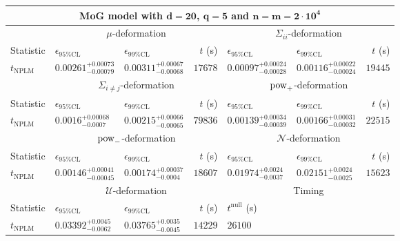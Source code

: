 \begin{tabular}{l|llr|llr}
	\toprule
	\multicolumn{7}{c}{{\bf MoG model with $\mathbf{d=20}$, $\mathbf{q=5}$ and $\mathbf{n=m=2\cdot 10^{4}}$}} \\
	\toprule
	\multicolumn{1}{c}{} & \multicolumn{3}{c}{$\mu$-deformation} & \multicolumn{3}{c}{$\Sigma_{ii}$-deformation} \\
	Statistic & $\epsilon_{95\%\mathrm{CL}}$ & $\epsilon_{99\%\mathrm{CL}}$ & $t$ (s) & $\epsilon_{95\%\mathrm{CL}}$ & $\epsilon_{99\%\mathrm{CL}}$ & $t$ (s) \\
	\midrule
	$t_{\mathrm{NPLM}}$ & $0.00261_{-0.00079}^{+0.00073}$ & $0.00311_{-0.00068}^{+0.00067}$ & $17678$ & $0.00097_{-0.00028}^{+0.00024}$ & $0.00116_{-0.00024}^{+0.00022}$ & $19445$ \\
	\toprule
	\multicolumn{1}{c}{} & \multicolumn{3}{c}{$\Sigma_{i\neq j}$-deformation} & \multicolumn{3}{c}{$\rm{pow}_{+}$-deformation} \\
	Statistic & $\epsilon_{95\%\mathrm{CL}}$ & $\epsilon_{99\%\mathrm{CL}}$ & $t$ (s) & $\epsilon_{95\%\mathrm{CL}}$ & $\epsilon_{99\%\mathrm{CL}}$ & $t$ (s) \\
	\midrule
	$t_{\mathrm{NPLM}}$ & $0.0016_{-0.0007}^{+0.00068}$ & $0.00215_{-0.00065}^{+0.00066}$ & $79836$ & $0.00139_{-0.00039}^{+0.00034}$ & $0.00166_{-0.00032}^{+0.00031}$ & $22515$ \\
	\toprule
	\multicolumn{1}{c}{} & \multicolumn{3}{c}{$\rm{pow}_{-}$-deformation} & \multicolumn{3}{c}{$\mathcal{N}$-deformation} \\
	Statistic & $\epsilon_{95\%\mathrm{CL}}$ & $\epsilon_{99\%\mathrm{CL}}$ & $t$ (s) & $\epsilon_{95\%\mathrm{CL}}$ & $\epsilon_{99\%\mathrm{CL}}$ & $t$ (s) \\
	\midrule
	$t_{\mathrm{NPLM}}$ & $0.00146_{-0.00045}^{+0.00041}$ & $0.00174_{-0.0004}^{+0.00037}$ & $18607$ & $0.01974_{-0.0037}^{+0.0024}$ & $0.02151_{-0.0025}^{+0.0024}$ & $15623$ \\
	\toprule
	\multicolumn{1}{c}{} & \multicolumn{3}{c}{$\mathcal{U}$-deformation} & \multicolumn{3}{c}{Timing} \\
	Statistic & $\epsilon_{95\%\mathrm{CL}}$ & $\epsilon_{99\%\mathrm{CL}}$ & $t$ (s) & $t^{\mathrm{null}}$ (s) \\
	\midrule
	$t_{\mathrm{NPLM}}$ & $0.03392_{-0.0062}^{+0.0045}$ & $0.03765_{-0.0045}^{+0.0035}$ & $14229$ & $26100$ \\
	\bottomrule
\end{tabular}